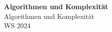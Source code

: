 \documentclass[11pt]{article}
\begin{document}
\thispagestyle{empty}

\newtheorem{anmk}{Anmerkung}[section]
\newtheorem{bsp}{Beispiel}[section]

\renewcommand{\figurename}{Fig.}

\newcommand{\ol}[1]{\begin{enumerate}#1\end{enumerate}}
\newcommand{\ul}[1]{\begin{itemize}#1\end{itemize}}
\newcommand{\li}[1]{\item{#1}}
\newcommand{\equivto}{\Longleftrightarrow}
\newcommand{\sube}{\subseteq}

\newcommand{\N}{\mathbb{N}}
\newcommand{\Z}{\mathbb{Z}}
\newcommand{\R}{\mathbb{R}}

\begin{center}
  {\LARGE \bf Algorithmen und Komplexität}\\
  {\Large Algorithmen und Komplexität}\\
  WS 2024
\end{center}
\end{document}
